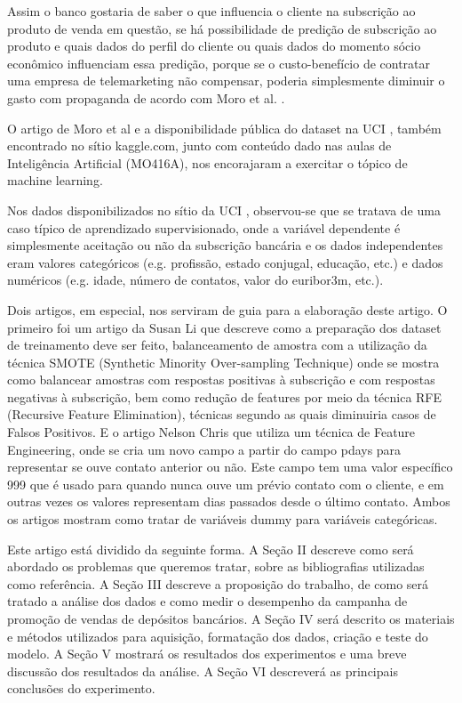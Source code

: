 \documentclass[twoside,conference,a4paper]{IEEEtran}
\begin{document}
Assim o banco gostaria de saber o que influencia o cliente na subscrição ao produto de venda em questão, se há possibilidade de predição de subscrição ao produto e quais dados do perfil do cliente ou quais dados do momento sócio econômico influenciam essa predição, porque se o custo-benefício de contratar uma empresa de telemarketing não compensar, poderia simplesmente diminuir o gasto com propaganda de acordo com Moro et al. \cite{Moro:2014}.

O artigo de Moro et al \cite{Moro:2014} e a disponibilidade pública do dataset na UCI \cite{UCI:2014}, também encontrado no sítio kaggle.com, junto com conteúdo dado nas aulas de Inteligência Artificial (MO416A), nos encorajaram a exercitar o tópico de machine learning.

Nos dados disponibilizados no sítio da UCI \cite{UCI:2014}, observou-se que se tratava de uma caso típico de aprendizado supervisionado, onde a variável dependente é simplesmente aceitação ou não da subscrição bancária e os dados independentes eram valores categóricos (e.g. profissão, estado conjugal, educação, etc.) e dados numéricos (e.g. idade, número de contatos, valor do euribor3m, etc.).

Dois artigos, em especial, nos serviram de guia para a elaboração deste artigo. O primeiro foi um artigo da Susan Li \cite{TowardsDataScience:2017} que descreve como a preparação dos dataset de treinamento deve ser feito, balanceamento de amostra com a utilização da técnica SMOTE (Synthetic Minority Over-sampling Technique) onde se mostra como balancear amostras com respostas positivas à subscrição e com respostas negativas à subscrição, bem como redução de features por meio da técnica RFE (Recursive Feature Elimination), técnicas segundo as quais diminuiria casos de Falsos Positivos. E o artigo Nelson Chris \cite{Medium:2019} que utiliza um técnica de Feature Engineering, onde se cria um novo campo a partir do campo pdays para representar se ouve contato anterior ou não. Este campo tem uma valor específico 999 que é usado para quando nunca ouve um prévio contato com o cliente, e em outras vezes os valores representam dias passados desde o último contato. Ambos os artigos mostram como tratar de variáveis dummy para variáveis categóricas.

Este artigo está dividido da seguinte forma. A Seção II descreve como será abordado os problemas que queremos tratar, sobre as bibliografias utilizadas como referência. A Seção III descreve a proposição do trabalho, de como será tratado a análise dos dados e como medir o desempenho da campanha de promoção de vendas de depósitos bancários. A Seção IV será descrito os materiais e métodos utilizados para aquisição, formatação dos dados, criação e teste do modelo. A Seção V mostrará os resultados dos experimentos e uma breve discussão dos resultados da análise. A Seção VI descreverá as principais conclusões do experimento.
\end{document}
